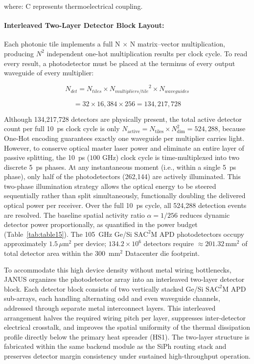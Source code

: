 \documentclass[journal]{IEEEtran}
\begin{document}
where: C represents thermoelectrical coupling.

\paragraph{\textbf{Interleaved Two-Layer Detector Block Layout:}}

Each photonic tile implements a full N $\times$ N matrix--vector multiplication, producing $N^{2}$ independent one-hot multiplication
results per clock cycle. To read every result, a photodetector must be placed at the terminus of every output waveguide of every multiplier:

\begin{equation}
N_{det} = N_{tiles} \times {N_{multipliers/tile}}^{2} \times N_{waveguides}
\end{equation}

\begin{equation}
= 32 \times 16,384 \times 256 = 134,217,728
\end{equation}

Although 134,217,728 detectors are physically present, the total active detector count per full 10~ps clock cycle is only $N_{\text{active}} = N_{\text{tiles}} \times N_{\text{dim}}^2 = 524,288$, because One-Hot encoding guarantees exactly one waveguide per multiplier carries light. However, to conserve optical master laser power and eliminate an entire layer of passive splitting, the 10~ps ($100\text{ GHz}$) clock cycle is time-multiplexed into two discrete 5~ps phases. At any instantaneous moment (i.e., within a single 5~ps phase), only half of the photodetectors (262,144) are actively illuminated. This two-phase illumination strategy allows the optical energy to be steered sequentially rather than split simultaneously, functionally doubling the delivered optical power per receiver. Over the full 10~ps cycle, all 524,288 detection events are resolved. The baseline spatial activity ratio $\alpha = 1/256$ reduces dynamic detector power proportionally, as quantified in the power budget (Table~\ref{tab:table15}). The 105~GHz Ge/Si $\mathrm{SAC^2M}$ APD photodetectors occupy approximately $1.5\,\mu\text{m}^2$ per device; $134.2 \times 10^{6}$ detectors require $\approx 201.32\,\text{mm}^2$ of total detector area within the 300~$\text{mm}^{2}$ Datacenter die footprint.

To accommodate this high device density without metal wiring bottlenecks, JANUS organizes the photodetector array into an interleaved two-layer detector block. Each detector block consists of two vertically stacked Ge/Si $\mathrm{SAC^2M}$ APD sub-arrays, each handling alternating odd and even waveguide channels, addressed through separate metal interconnect layers. This interleaved arrangement halves the required wiring pitch per layer, suppresses inter-detector electrical crosstalk, and improves the spatial uniformity of the thermal dissipation profile directly below the primary heat spreader (HS1). The two-layer structure is fabricated within the same backend module as the SiPh routing stack and preserves detector margin consistency under sustained high-throughput operation.
\end{document}
